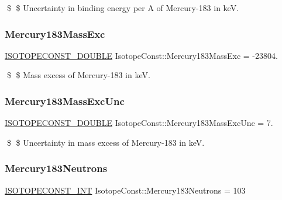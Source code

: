 \$ \$ Uncertainty in binding energy per A of Mercury-\/183 in keV. \mbox{\label{group___isotope_const-_mercury-_hg183_gac0c1d6fc3358144a3b1137be041c1385}} 
\subsubsection{\texorpdfstring{Mercury183\+Mass\+Exc}{Mercury183MassExc}}
{\footnotesize\ttfamily \mbox{\hyperlink{group___isotope_const-_macros_ga8f45a7272ce02c0b4c65c44636ed719a}{I\+S\+O\+T\+O\+P\+E\+C\+O\+N\+S\+T\+\_\+\+D\+O\+U\+B\+LE}} Isotope\+Const\+::\+Mercury183\+Mass\+Exc = -\/23804.}

\$ \$ Mass excess of Mercury-\/183 in keV. \mbox{\label{group___isotope_const-_mercury-_hg183_gade9a5a34e85021ebfcb38d9107514af0}} 
\subsubsection{\texorpdfstring{Mercury183\+Mass\+Exc\+Unc}{Mercury183MassExcUnc}}
{\footnotesize\ttfamily \mbox{\hyperlink{group___isotope_const-_macros_ga8f45a7272ce02c0b4c65c44636ed719a}{I\+S\+O\+T\+O\+P\+E\+C\+O\+N\+S\+T\+\_\+\+D\+O\+U\+B\+LE}} Isotope\+Const\+::\+Mercury183\+Mass\+Exc\+Unc = 7.}

\$ \$ Uncertainty in mass excess of Mercury-\/183 in keV. \mbox{\label{group___isotope_const-_mercury-_hg183_ga22b3facdb0c1091a2fe283c1cd166a2b}} 
\subsubsection{\texorpdfstring{Mercury183\+Neutrons}{Mercury183Neutrons}}
{\footnotesize\ttfamily \mbox{\hyperlink{group___isotope_const-_macros_ga5f18360b3e99483a35c32d789e62621c}{I\+S\+O\+T\+O\+P\+E\+C\+O\+N\+S\+T\+\_\+\+I\+NT}} Isotope\+Const\+::\+Mercury183\+Neutrons = 103}

